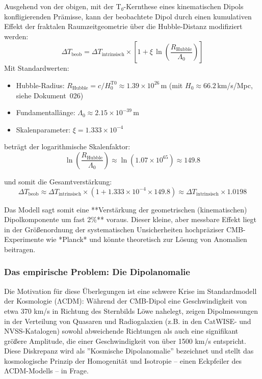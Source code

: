 Ausgehend von der obigen, mit der T₀-Kernthese eines kinematischen Dipols konfligierenden Prämisse, kann der beobachtete Dipol durch einen kumulativen Effekt der fraktalen Raumzeitgeometrie über die Hubble-Distanz modifiziert werden:
\[
\Delta T_{\text{beob}} = \Delta T_{\text{intrinsisch}} \times \left[1 + \xi \, \ln\left(\frac{R_{\text{Hubble}}}{\Lambda_0}\right)\right]
\]
Mit Standardwerten:
\begin{itemize}
	\item Hubble-Radius: $R_{\text{Hubble}} = c/H_0^{\text{T0}} \approx 1.39 \times 10^{26} \, \text{m}$ (mit $H_0 \approx 66.2\,$km/s/Mpc, siehe Dokument~026)
	\item Fundamentallänge: $\Lambda_0 \approx 2.15 \times 10^{-39} \, \text{m}$
	\item Skalenparameter: $\xi = 1.333 \times 10^{-4}$
\end{itemize}

beträgt der logarithmische Skalenfaktor:
\[
\ln\left(\frac{R_{\text{Hubble}}}{\Lambda_0}\right) \approx \ln(1.07 \times 10^{65}) \approx 149.8
\]

und somit die Gesamtverstärkung:
\[
\Delta T_{\text{beob}} \approx \Delta T_{\text{intrinsisch}} \times (1 + 1.333\times10^{-4} \times 149.8) \approx \Delta T_{\text{intrinsisch}} \times 1.0198
\]

Das Modell sagt somit eine **Verstärkung der geometrischen (kinematischen) Dipolkomponente um fast 2\%** voraus. Dieser kleine, aber messbare Effekt liegt in der Größenordnung der systematischen Unsicherheiten hochpräziser CMB-Experimente wie *Planck* und könnte theoretisch zur Lösung von Anomalien beitragen.

\subsubsection*{Das empirische Problem: Die Dipolanomalie}

Die Motivation für diese Überlegungen ist eine schwere Krise im Standardmodell der Kosmologie (ΛCDM): Während der CMB-Dipol eine Geschwindigkeit von etwa 370 km/s in Richtung des Sternbilds Löwe nahelegt, zeigen Dipolmessungen in der Verteilung von Quasaren und Radiogalaxien (z.B. in den CatWISE- und NVSS-Katalogen) sowohl abweichende Richtungen als auch eine signifikant größere Amplitude, die einer Geschwindigkeit von über 1500 km/s entspricht. Diese Diskrepanz wird als ''Kosmische Dipolanomalie'' bezeichnet und stellt das kosmologische Prinzip der Homogenität und Isotropie – einen Eckpfeiler des ΛCDM-Modells – in Frage.

